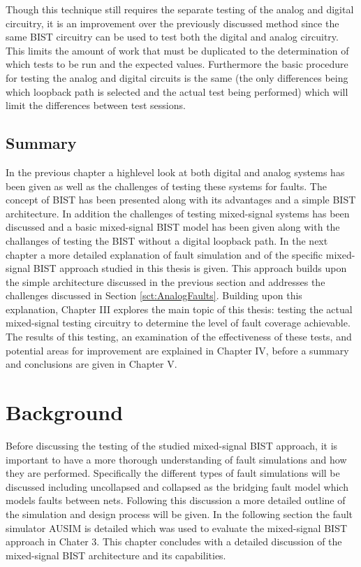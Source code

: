 \documentclass[12pt]{report}
\begin{document}
Though this technique still requires the separate testing of the analog and digital circuitry, it is an improvement over the previously discussed method since the same BIST circuitry can be used to test both the digital and analog circuitry\cite{stroud}.  This limits the amount of work that must be duplicated to the determination of which tests to be run and the expected values.  Furthermore the basic procedure for testing the analog and digital circuits is the same (the only differences being which loopback path is selected and the actual test being performed) which will limit the differences between test sessions.

\section{Summary}
In the previous chapter a highlevel look at both digital and analog systems has been given as well as the challenges of testing these systems for faults.  The concept of BIST has been presented along with its advantages and a simple BIST architecture.  In addition the challenges of testing mixed-signal systems has been discussed and a basic mixed-signal BIST model has been given along with the challanges of testing the BIST without a digital loopback path.  In the next chapter a more detailed explanation of fault simulation and of the specific mixed-signal BIST approach studied in this thesis is given.  This approach builds upon the simple architecture discussed in the previous section and addresses the challenges discussed in Section \ref{sct:AnalogFaults}.  Building upon this explanation, Chapter III explores the main topic of this thesis: testing the actual mixed-signal testing circuitry to determine the level of fault coverage achievable.  The results of this testing, an examination of the effectiveness of these tests, and potential areas for improvement are explained in Chapter IV, before a summary and conclusions are given in Chapter V.

\chapter{Background}

Before discussing the testing of the studied mixed-signal BIST approach, it is important to have a more thorough understanding of fault simulations and how they are performed.  Specifically the different types of fault simulations will be discussed including uncollapsed and collapsed as the bridging fault model which models faults between nets.  Following this discussion a more detailed outline of the simulation and design process will be given.  In the following section the fault simulator AUSIM is detailed which was used to evaluate the mixed-signal BIST approach in Chater 3.  This chapter concludes with a detailed discussion of the mixed-signal BIST architecture and its capabilities.
\end{document}
